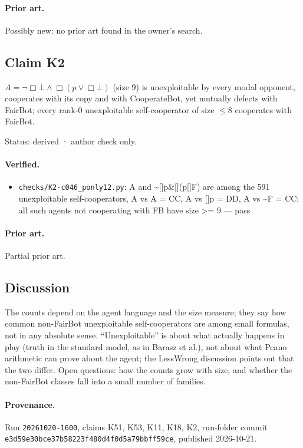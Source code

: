 \documentclass{article}
\begin{document}
\paragraph{Prior art.} Possibly new: no prior art found in the owner's search.

\subsection*{Claim K2}

$A=\neg\Box\bot\wedge\Box(p\vee\Box\bot)$ (size 9) is unexploitable by every modal opponent, cooperates with its copy and with CooperateBot, yet mutually defects with FairBot; every rank-0 unexploitable self-cooperator of size $\le 8$ cooperates with FairBot.

Status: derived · author check only.

\paragraph{Verified.}
\begin{itemize}
\item \texttt{checks/K2-c046\_ponly12.py}: A and \textasciitilde{}[]p\&[](p\textbar{}[]F) are among the 591 unexploitable self-cooperators, A vs A = CC, A vs []p = DD, A vs \textasciitilde{}F = CC; all such agents not cooperating with FB have size \textgreater{}= 9 --- pass
\end{itemize}

\paragraph{Prior art.} Partial prior art.

\subsection*{Discussion}

The counts depend on the agent language and the size measure; they say how common
non-FairBot unexploitable self-cooperators are among small formulas, not in any absolute sense.
``Unexploitable'' is about what actually happens in play (truth in the standard model, as in Barasz
et al.), not about what Peano arithmetic can prove about the agent; the LessWrong discussion
points out that the two differ. Open questions: how the counts grow with size, and whether the
non-FairBot classes fall into a small number of families.

\paragraph{Provenance.}
Run \texttt{20261020-1600}, claims K51, K53, K11, K18, K2, run-folder commit \texttt{e3d59e30bce37b58223f480d4f0d5a79bbff59ce}, published 2026-10-21.
\end{document}
